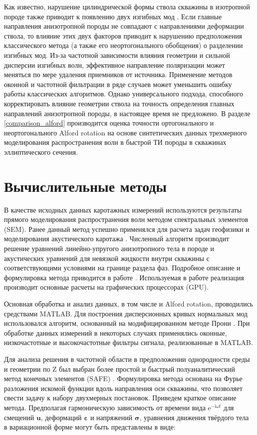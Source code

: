 \documentclass[a4paper,11pt]{article}
\newcommand{\ii}{\mathrm{i}}
\begin{document}
Как известно, нарушение цилиндрической формы ствола скважины в изотропной породе также приводит к появлению двух изгибных мод \cite{Seroices2010}. Если главные направления анизотропной породы не совпадают с направлениями деформации ствола, то влияние этих двух факторов приводит к нарушению предположения классического метода (а также его неортогонального обобщения) о разделении изгибных мод. Из-за частотной зависимости влияния геометрии и сильной дисперсии изгибных волн, эффективное направление поляризации может меняться по мере удаления приемников от источника.
Применение методов оконной и частотной фильтрации в ряде случаев может уменьшить ошибку работы классических алгоритмов. Однако универсального подхода, способного корректировать влияние геометрии ствола на точность определения главных направлений анизотропной породы, в настоящее время не предложено. В разделе \ref{comparison_alford} производится оценка точности ортогонального и неортогонального Alford rotation на основе синтетических данных трехмерного моделирования распространения волн в быстрой ТИ породы в скважинах эллиптического сечения.  

\section{Вычислительные методы}

В качестве исходных данных каротажных измерений используются результаты прямого моделирования распространения волн методом спектральных элементов (SEM). Ранее данный метод успешно применялся для расчета задач геофизики \cite{Komatitsch1999} и моделирования акустического каротажа \cite{Charara2011}. Численный алгоритм производит решение уравнений линейно-упругого анизотропного тела в породе и акустических уравнений для невязкой жидкости внутри скважины с соответствующими условиями на границе раздела фаз. Подробное описание и формулировка метода приводится в работе \cite{Komatitsch1999}. Используемая в работе реализация производит основные расчеты на графических процессорах (GPU).

Основная обработка и анализ данных, в том числе и Alford rotation, проводились средствами MATLAB. Для построения дисперсионных кривых нормальных мод использовался алгоритм, основанный на модифицированном методе Прони \cite{Ekstrom1995}. При обработке данных измерений в некоторых случаях применялись оконные, низкочастотные и высокочастотные фильтры сигнала, реализованные в MATLAB.   

Для анализа решения в частотной области в предположении однородности среды и геометрии по Z был выбран более простой и быстрый полуаналитический метод конечных элементов (SAFE) \cite{Bartoli2006}. Формулировка метода основана на Фурье разложения искомой функции вдоль направления оси скважины, что позволяет свести задачу к набору двухмерных постановок. Приведем краткое описание метода. Предполагая гармоническую зависимость от времени вида $\mathrm{e}^{-\ii\omega t}$ для смещений $\mathbf{u}$, деформаций $\boldsymbol{\varepsilon}$ и напряжений $\boldsymbol{\sigma}$, уравнения движения твёрдого тела в вариационной форме могут быть представлены в виде:
\end{document}
